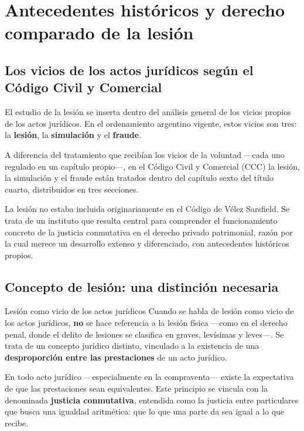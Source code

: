 \documentclass[12pt,oneside]{book}
\begin{document}
\chapter[Antecedentes históricos y derecho comparado]{Antecedentes históricos y derecho comparado de la lesión}

\section{Los vicios de los actos jurídicos según el Código Civil y Comercial}

El estudio de la lesión se inserta dentro del análisis general de los vicios propios de los actos jurídicos. En el ordenamiento argentino vigente, estos vicios son tres: la \textbf{lesión}, la \textbf{simulación} y el \textbf{fraude}.

A diferencia del tratamiento que recibían los vicios de la voluntad —cada uno regulado en un capítulo propio—, en el Código Civil y Comercial (CCC) la lesión, la simulación y el fraude están tratados dentro del capítulo sexto del título cuarto, distribuidos en tres secciones.

\begin{note}
La lesión no estaba incluida originariamente en el Código de Vélez Sarsfield. Se trata de un instituto que resulta central para comprender el funcionamiento concreto de la justicia conmutativa en el derecho privado patrimonial, razón por la cual merece un desarrollo extenso y diferenciado, con antecedentes históricos propios.
\end{note}

\section{Concepto de lesión: una distinción necesaria}

\begin{definition}{Lesión como vicio de los actos jurídicos}
Cuando se habla de lesión como vicio de los actos jurídicos, \textbf{no} se hace referencia a la lesión física —como en el derecho penal, donde el delito de lesiones se clasifica en graves, levísimas y leves—. Se trata de un concepto jurídico distinto, vinculado a la existencia de una \textbf{desproporción entre las prestaciones} de un acto jurídico.
\end{definition}

En todo acto jurídico —especialmente en la compraventa— existe la expectativa de que las prestaciones sean equivalentes. Este principio se vincula con la denominada \textbf{justicia conmutativa}, entendida como la justicia entre particulares que busca una igualdad aritmética: que lo que una parte da sea igual a lo que recibe.
\end{document}
